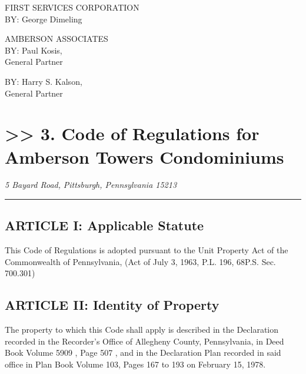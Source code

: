 \documentclass[
]{book}
\begin{document}
FIRST SERVICES CORPORATION\\
BY: George Dimeling

AMBERSON ASSOCIATES\\
BY: Paul Kosis,\\
General Partner

BY: Harry S. Kalson,\\
General Partner

\hypertarget{code-of-regulations-for-amberson-towers-condominiums}{%
\chapter*{\texorpdfstring{\textgreater\textgreater{} 3. Code of Regulations for Amberson Towers Condominiums}{\textgreater\textgreater{} 3. Code of Regulations for   Amberson Towers Condominiums}}\label{code-of-regulations-for-amberson-towers-condominiums}}

\emph{5 Bayard Road, }
\emph{Pittsburgh, Pennsylvania 15213}

\begin{center}\rule{0.5\linewidth}{0.5pt}\end{center}

\hypertarget{article-i-applicable-statute}{%
\section*{ARTICLE I: Applicable Statute}\label{article-i-applicable-statute}}

This Code of Regulations is adopted pursuant to the Unit Property Act of the Commonwealth of Pennsylvania, (Act of July 3, 1963, P.L. 196, 68P.S. Sec. 700.301)

\hypertarget{article-ii-identity-of-property}{%
\section*{ARTICLE II: Identity of Property}\label{article-ii-identity-of-property}}

The property to which this Code shall apply is described in the Declaration recorded in the Recorder's Office of Allegheny County, Pennsylvania, in Deed Book Volume 5909 , Page 507 , and in the Declaration Plan recorded in said office in Plan Book Volume 103, Pages 167 to 193 on February 15, 1978.
\end{document}
